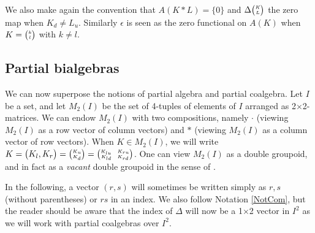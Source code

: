 We also make again the convention that $A(K*L)=\{0\}$ and $\Delta{\tiny {\begin{pmatrix} K\\L\end{pmatrix}}}$ the zero map when $K_d \neq L_u$. Similarly $\epsilon$ is seen as the zero functional on $A(K)$ when $K={\tiny {\begin{pmatrix} k\\l\end{pmatrix}}}$ with $k\neq l$. 

\subsection{Partial bialgebras}


We can now superpose the notions of partial algebra and partial coalgebra. Let $I$ be a set, and let $M_2(I)$ be the set of 4-tuples of elements of $I$ arranged as 2$\times$2-matrices. We can endow $M_2(I)$ with two compositions, namely $\cdot$ (viewing $M_2(I)$ as a row vector of column vectors) and $*$ (viewing $M_2(I)$ as a column vector of row vectors). When $K\in M_2(I)$, we will write $K = {\begin{pmatrix} K_l, K_r\end{pmatrix}} = {\tiny {\begin{pmatrix} K_u\\K_d\end{pmatrix}}} = {{\tiny \begin{pmatrix} K_{lu} \quad K_{ru} \\ K_{ld} \quad K_{rd}\end{pmatrix}}}$. One can view $M_2(I)$ as a double groupoid, and in fact as a \emph{vacant} double groupoid in the sense of \cite{AN1}. 

In the following, a vector $(r,s)$ will sometimes be written simply as $r,s$ (without parentheses) or $rs$ in an index. We also follow Notation \ref{NotCom}, but the reader should be aware that the index of $\Delta$ will now be a 1$\times$2 vector in $I^2$ as we will work with partial coalgebras over $I^2$.

